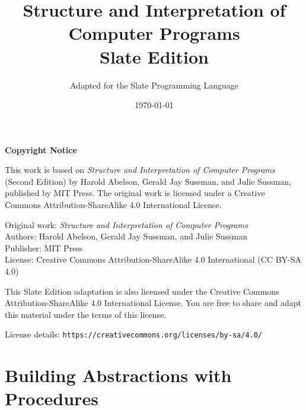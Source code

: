 \documentclass[11pt]{book}
\title{Structure and Interpretation of Computer Programs\\
\large Slate Edition}
\author{Adapted for the Slate Programming Language}
\date{\today}
\begin{document}
\maketitle

\newpage

\vspace*{\fill}

\noindent
\textbf{Copyright Notice}

\vspace{0.5cm}

\noindent
This work is based on \textit{Structure and Interpretation of Computer Programs} (Second Edition) by Harold Abelson, Gerald Jay Sussman, and Julie Sussman, published by MIT Press. The original work is licensed under a Creative Commons Attribution-ShareAlike 4.0 International License.

\vspace{0.3cm}

\noindent
Original work: \textit{Structure and Interpretation of Computer Programs} \\
Authors: Harold Abelson, Gerald Jay Sussman, and Julie Sussman \\
Publisher: MIT Press \\
License: Creative Commons Attribution-ShareAlike 4.0 International (CC BY-SA 4.0)

\vspace{0.3cm}

\noindent
This Slate Edition adaptation is also licensed under the Creative Commons Attribution-ShareAlike 4.0 International License. You are free to share and adapt this material under the terms of this license.

\vspace{0.3cm}

\noindent
License details: \texttt{https://creativecommons.org/licenses/by-sa/4.0/}

\vspace*{\fill}

\tableofcontents

\chapter{Building Abstractions with Procedures}








\end{document}
